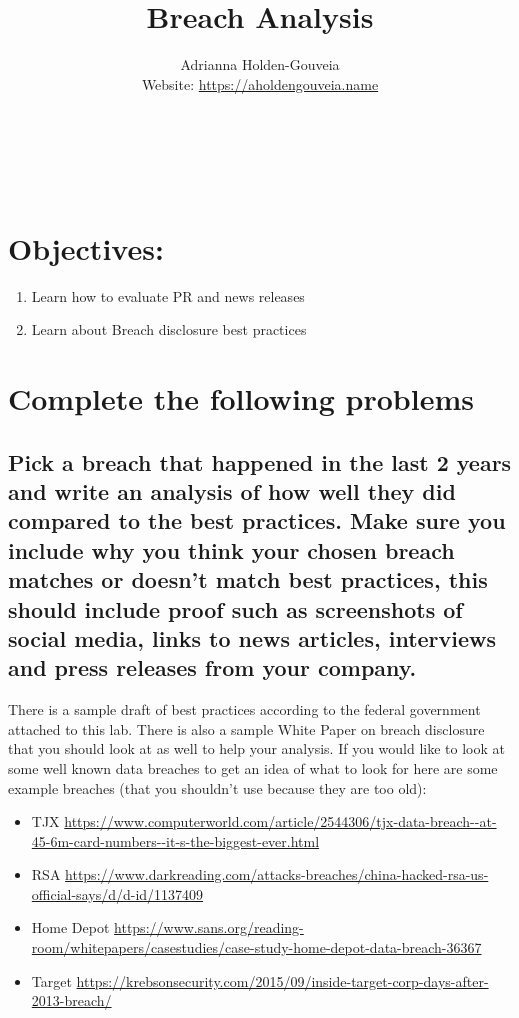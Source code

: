 \documentclass[12pt]{article}
\title{Breach Analysis}
\author{
        Adrianna Holden-Gouveia \\
        Website: \url{https://aholdengouveia.name}\\ 
        \date{\vspace{-5ex}}
        \faLinkedin{: aholdengouveia} \\
        \faGithub {: aholdengouveia} \\
        \faTwitter {: aholdengouveia} \\
        }
\begin{document}
    

\maketitle


\section*{Objectives:}
\begin{enumerate}
    \item Learn how to evaluate PR and news releases
    \item Learn about Breach disclosure best practices
\end{enumerate}
\section*{Complete the following problems}


\subsection*{Pick a breach that happened in the last 2 years and write an analysis of how well they did compared to the best practices. Make sure you include why you think your chosen breach matches or doesn't match best practices, this should include proof such as screenshots of social media, links to news articles, interviews and press releases from your company.}
There is a sample draft of best practices according to the federal government attached to this lab.  There is also a sample White Paper on breach disclosure that you should look at as well to help your analysis.  If you would like to look at some well known data breaches to get an idea of what to look for here are some example breaches (that you shouldn't use because they are too old):
    \begin{itemize}
        \item TJX \url{https://www.computerworld.com/article/2544306/tjx-data-breach--at-45-6m-card-numbers--it-s-the-biggest-ever.html}
        \item RSA \url{https://www.darkreading.com/attacks-breaches/china-hacked-rsa-us-official-says/d/d-id/1137409}
        \item Home Depot \url{https://www.sans.org/reading-room/whitepapers/casestudies/case-study-home-depot-data-breach-36367}
        \item Target \url{https://krebsonsecurity.com/2015/09/inside-target-corp-days-after-2013-breach/}
    \end{itemize}
\end{document}
